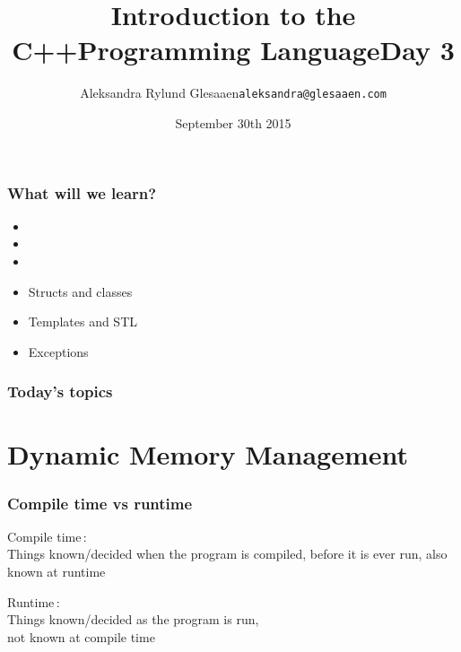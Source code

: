 \documentclass[14pt,a4paper,dvipsnames,usenames]{beamer}
\title[C++ Day3]{Introduction to the C++\newline{}Programming Language\newline{}\newline{}\fontsize{16pt}{16pt}\selectfont{}Day 3}
\author{\texorpdfstring{%
    Aleksandra Rylund Glesaaen\newline\fontsize{12pt}{12pt}\selectfont\texttt{aleksandra@glesaaen.com}%
  }{%
    Aleksandra Rylund Glesaaen}}
\date{September 30th 2015}
\begin{document}
\begin{frame}
\titlepage
\end{frame}

\begin{frame}
  \frametitle{What will we learn?}

  \begin{itemize}
    \setlength\itemsep{.5em}
    \item {}
    \item {}
    \item {}
    \item Structs and classes 
    \item Templates and STL 
    \item Exceptions 
  \end{itemize}
\end{frame}

\begin{frame}
  \frametitle{Today's topics}

  \tableofcontents
  
\end{frame}

\section{Dynamic Memory Management}

\frame[plain]{\sectionpage}

\begin{frame}[plain]
  \nointerlineskip
\end{frame}

\begin{frame}
  \frametitle{Compile time \:vs\: runtime}

  {\large\color{FeebleWeek}Compile time}\,:\\[3pt]
  Things known/decided when the program is compiled, before it is ever run, also known at runtime


  \vspace{1em}
  {\large\color{Marty}Runtime}\,:\\[3pt]
  Things known/decided as the program is run,\\not known at compile time
  
\end{frame}
\end{document}
